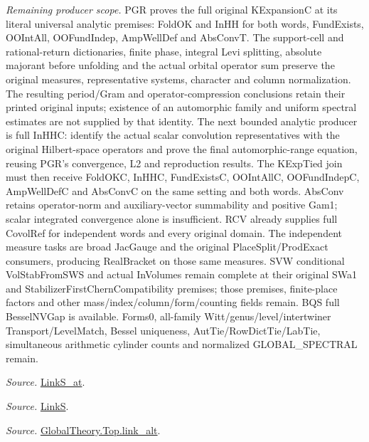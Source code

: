 \emph{Remaining producer scope.} PGR proves the full original KExpansionC at its literal universal analytic premises: FoldOK and InHH for both words, FundExists, OOIntAll, OOFundIndep, AmpWellDef and AbsConvT. The support-cell and rational-return dictionaries, finite phase, integral Levi splitting, absolute majorant before unfolding and the actual orbital operator sum preserve the original measures, representative systems, character and column normalization. The resulting period/Gram and operator-compression conclusions retain their printed original inputs; existence of an automorphic family and uniform spectral estimates are not supplied by that identity. The next bounded analytic producer is full InHHC: identify the actual scalar convolution representatives with the original Hilbert-space operators and prove the final automorphic-range equation, reusing PGR's convergence, L2 and reproduction results. The KExpTied join must then receive FoldOKC, InHHC, FundExistsC, OOIntAllC, OOFundIndepC, AmpWellDefC and AbsConvC on the same setting and both words. AbsConv retains operator-norm and auxiliary-vector summability and positive Gam1; scalar integrated convergence alone is insufficient. RCV already supplies full CovolRef for independent words and every original domain. The independent measure tasks are broad JacGauge and the original PlaceSplit/ProdExact consumers, producing RealBracket on those same measures. SVW conditional VolStabFromSWS and actual InVolumes remain complete at their original SWa1 and StabilizerFirstChernCompatibility premises; those premises, finite-place factors and other mass/index/column/form/counting fields remain. BQS full BesselNVGap is available. Forms0, all-family Witt/genus/level/intertwiner Transport/LevelMatch, Bessel uniqueness, AutTie/RowDictTie/LabTie, simultaneous arithmetic cylinder counts and normalized GLOBAL\_\allowbreak SPECTRAL remain.

\emph{Source.} \href{https://github.com/CocoSgt/riemann-hypothesis-lean/blob/7cbf7a0c32fca1badf05931879a37c3f8a2b03b4/src/Formalism/SharpRestriction/GlobalTheoremInputs.lean#L145-L149}{LinkS\_\allowbreak at}.

\emph{Source.} \href{https://github.com/CocoSgt/riemann-hypothesis-lean/blob/7cbf7a0c32fca1badf05931879a37c3f8a2b03b4/src/Formalism/SharpRestriction/GlobalTheoremInputs.lean#L152-L157}{LinkS}.

\emph{Source.} \href{https://github.com/CocoSgt/riemann-hypothesis-lean/blob/7cbf7a0c32fca1badf05931879a37c3f8a2b03b4/src/Development/AbelianVarietyTheory/Proofs/GlobalInterpolation/LinkAlt.lean#L16-L50}{GlobalTheory.Top.link\_\allowbreak alt}.



